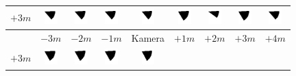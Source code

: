 \begin{tabular}{|c|c|c|c|c|c|c|c|c|}
	\hline 
	$+3m$ &
	\includegraphics[width=0.5cm]{img_Bereich/V2_img_Winkel_Y_-3000_3000.png}&
	\includegraphics[width=0.5cm]{img_Bereich/V2_img_Winkel_Y_-2000_3000.png}&
	\includegraphics[width=0.5cm]{img_Bereich/V2_img_Winkel_Y_-1000_3000.png}&
	\includegraphics[width=0.5cm]{img_Bereich/V2_img_Winkel_Y_0_3000.png}&
	\includegraphics[width=0.5cm]{img_Bereich/V2_img_Winkel_Y_1000_3000.png}&
	\includegraphics[width=0.5cm]{img_Bereich/V2_img_Winkel_Y_2000_3000.png}&
	\includegraphics[width=0.5cm]{img_Bereich/V2_img_Winkel_Y_3000_3000.png}&
	\includegraphics[width=0.5cm]{img_Bereich/V2_img_Winkel_Y_4000_3000.png}\\ 
	\hline 
	& $-3m$ & $-2m$ & $-1m$ &Kamera& $+1m$ & $+2m$ & $+3m$ & $+4m$ \\ 
	\hline
	\hline 
	$+3m$ &
	\includegraphics[width=0.5cm]{img_Bereich/V2_vid_Winkel_Y_-3000_3000.png}&
	\includegraphics[width=0.5cm]{img_Bereich/V2_vid_Winkel_Y_-2000_3000.png}&
	\includegraphics[width=0.5cm]{img_Bereich/V2_vid_Winkel_Y_-1000_3000.png}&
	\includegraphics[width=0.5cm]{img_Bereich/V2_vid_Winkel_Y_0_3000.png}&

\end{tabular}
